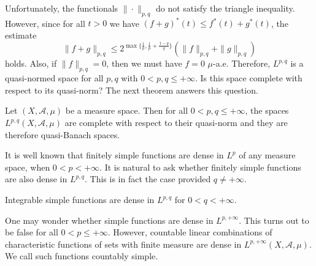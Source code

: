 Unfortunately, the functionals $\|\cdot\|_{p,q}$ do not satisfy the triangle inequality. However, since for all $t>0$ we have $(f+g)^*(t)\leq f^*(t)+g^*(t)$, the estimate
\[\|f+g\|_{p,q}\leq 2^{\max\{\frac{1}{p},\frac{1}{p}+\frac{1-q}{q}\}}(\|f\|_{p,q}+\|g\|_{p,q})\]
holds. Also, if $\|f\|_{p,q}=0$, then we must have $f=0$ $\mu$-a.e. Therefore, $L^{p,q}$ is a quasi-normed space for all $p,q$ with $0<p,q\leq+\infty$. Is this space complete with respect to its quasi-norm? The next theorem answers this question.
\begin{theorem}
Let $(X,\mathcal{A},\mu)$ be a measure space. Then for all $0<p,q\leq+\infty$, the spaces $L^{p,q}(X,\mathcal{A},\mu)$ are complete with respect to their quasi-norm and they are therefore quasi-Banach spaces.
\end{theorem}
It is well known that finitely simple functions are dense in $L^p$ of any measure space, when $0<p<+\infty$. It is natural to ask whether finitely simple functions are also dense in $L^{p,q}$. This is in fact the case provided $q\neq+\infty$.
\begin{proposition}
Integrable simple functions are dense in $L^{p,q}$ for $0<q<+\infty$.
\end{proposition}
\begin{remark}
One may wonder whether simple functions are dense in $L^{p,+\infty}$. This
turns out to be false for all $0<p\leq+\infty$. However, countable linear combinations of characteristic functions of sets with finite measure are dense in $L^{p,+\infty}(X,\mathcal{A},\mu)$. We call such functions countably simple.
\end{remark}
